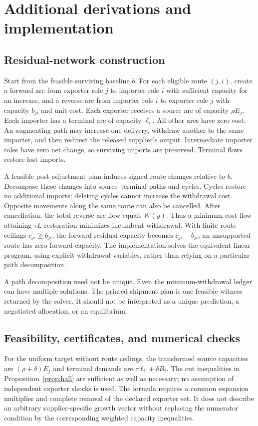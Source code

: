 \documentclass[11pt,a4paper]{article}
\begin{document}


\clearpage
\appendix
\section{Additional derivations and implementation}\label{app:proofs}
\subsection{Residual-network construction}
Start from the feasible surviving baseline $b$. For each eligible route $(j,i)$, create a forward arc from exporter role $j$ to importer role $i$ with sufficient capacity for an increase, and a reverse arc from importer role $i$ to exporter role $j$ with capacity $b_{ji}$ and unit cost. Each exporter receives a source arc of capacity $\rho E_j$. Each importer has a terminal arc of capacity $\ell_i$. All other arcs have zero cost. An augmenting path may increase one delivery, withdraw another to the same importer, and then redirect the released supplier's output. Intermediate importer roles have zero net change, so surviving imports are preserved. Terminal flows restore lost imports.

A feasible post-adjustment plan induces signed route changes relative to $b$. Decompose these changes into source--terminal paths and cycles. Cycles restore no additional imports; deleting cycles cannot increase the withdrawal cost. Opposite movements along the same route can also be cancelled. After cancellation, the total reverse-arc flow equals $W(y)$. Thus a minimum-cost flow attaining $\tau L$ restoration minimizes incumbent withdrawal. With finite route ceilings $c_{ji}\geq b_{ji}$, the forward residual capacity becomes $c_{ji}-b_{ji}$; an unsupported route has zero forward capacity. The implementation solves the equivalent linear program, using explicit withdrawal variables, rather than relying on a particular path decomposition.

A path decomposition need not be unique. Even the minimum-withdrawal ledger can have multiple solutions. The printed shipment plan is one feasible witness returned by the solver. It should not be interpreted as a unique prediction, a negotiated allocation, or an equilibrium.

\subsection{Feasibility, certificates, and numerical checks}
For the uniform target without route ceilings, the transformed source capacities are $(\rho+\delta)E_j$ and terminal demands are $\tau\ell_i+\delta B_i$. The cut inequalities in Proposition~\ref{prop:hall} are sufficient as well as necessary; no assumption of independent exporter shocks is used. The formula requires a common expansion multiplier and complete removal of the declared exporter set. It does not describe an arbitrary supplier-specific growth vector without replacing the numerator condition by the corresponding weighted capacity inequalities.
\end{document}
